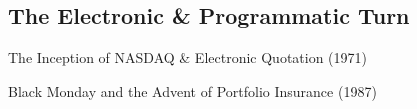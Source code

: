\documentclass[10pt]{article}
\begin{document}
  \subsection{The Electronic \& Programmatic Turn}

    \begin{core}{The Inception of NASDAQ \& Electronic Quotation (1971)}


    \end{core}

    \begin{core}{Black Monday and the Advent of Portfolio Insurance (1987)}


    \end{core}
\end{document}
